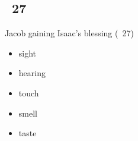 \subsection*{~27}

\begin{frame}{Jacob gaining Isaac’s blessing (~27)}
	\begin{itemize}
		\item [\checkmark] sight
		\item [\checkmark] hearing
		\item [\checkmark] touch
		\item [\checkmark] smell
		\item [\checkmark] taste
	\end{itemize}
\end{frame}
